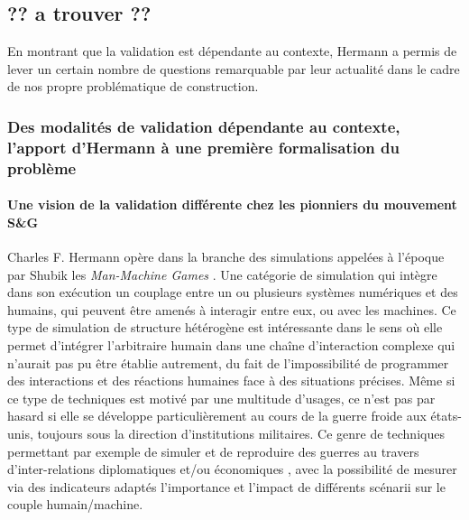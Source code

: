 
\subsection{?? a trouver ??}
\label{ssec:evaluation_construction}


En montrant que la validation est dépendante au contexte, Hermann a permis de lever un certain nombre de questions remarquable par leur actualité dans le cadre de nos propre problématique de construction.  %

\subsubsection{Des modalités de validation dépendante au contexte, l'apport d'Hermann à une première formalisation du problème}

\paragraph{Une vision de la validation différente chez les pionniers du mouvement S\&G}

Charles F. Hermann opère dans la branche des simulations appelées à l'époque par Shubik les \textit{Man-Machine Games} \autocite{Shubik1972}. Une catégorie de simulation qui intègre dans son exécution un couplage entre un ou plusieurs systèmes numériques et des humains, qui peuvent être amenés à interagir entre eux, ou avec les machines. Ce type de simulation de structure hétérogène est intéressante dans le sens où elle permet d'intégrer l'arbitraire humain dans une chaîne d'interaction complexe qui n'aurait pas pu être établie autrement, du fait de l'impossibilité de programmer des interactions et des réactions humaines face à des situations précises. Même si ce type de techniques est motivé par une multitude d'usages, ce n'est pas par hasard si elle se développe particulièrement au cours de la guerre froide aux états-unis, toujours sous la direction d'institutions militaires. Ce genre de techniques permettant par exemple de simuler et de reproduire des guerres au travers d'inter-relations diplomatiques et/ou économiques \autocite{Hermann1967b}, avec la possibilité de mesurer via des indicateurs adaptés l'importance et l'impact de différents scénarii sur le couple humain/machine.

